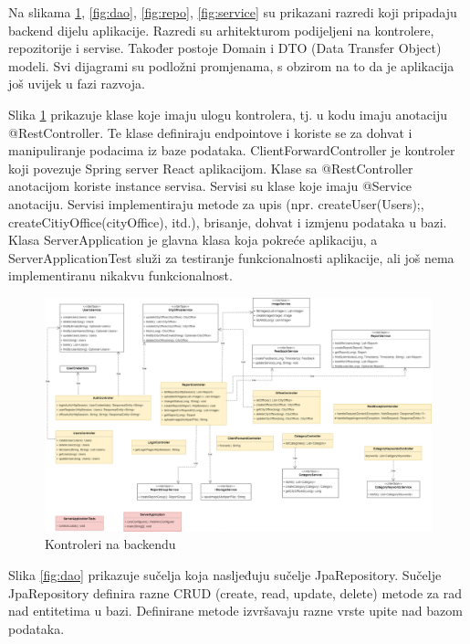			Na slikama \ref{fig:kontroler}, \ref{fig:dao}, \ref{fig:repo}, \ref{fig:service} su prikazani razredi koji pripadaju backend dijelu aplikacije. Razredi su arhitekturom podijeljeni na kontrolere, repozitorije i servise. Također postoje Domain i DTO (Data Transfer Object) modeli. Svi dijagrami su podložni promjenama, s obzirom na to da je aplikacija još uvijek u fazi razvoja.
		
			Slika \ref{fig:kontroler} prikazuje klase koje imaju ulogu kontrolera, tj. u kodu imaju anotaciju @RestController. Te klase definiraju endpointove i koriste se za dohvat i manipuliranje podacima iz baze podataka. ClientForwardController je kontroler koji povezuje Spring server React aplikacijom. Klase sa @RestController anotacijom koriste instance servisa. Servisi su klase koje imaju @Service anotaciju. Servisi implementiraju metode za upis (npr. createUser(Users);, createCitiyOffice(cityOffice), itd.), brisanje, dohvat i izmjenu podataka u bazi. Klasa ServerApplication je glavna klasa koja pokreće aplikaciju, a ServerApplicationTest služi za testiranje funkcionalnosti aplikacije, ali još nema implementiranu nikakvu funkcionalnost.
		
			\begin{figure}[H]
				\includegraphics[width=\textwidth]{slike/controller.png} %
				\caption{Kontroleri na backendu}
				\label{fig:kontroler} %
			\end{figure}
			
			\eject
			
			Slika \ref{fig:dao} prikazuje sučelja koja nasljeđuju sučelje JpaRepository. Sučelje JpaRepository definira razne CRUD (create, read, update, delete) metode za rad nad entitetima u bazi. Definirane metode izvršavaju razne vrste upite nad bazom podataka.
			

